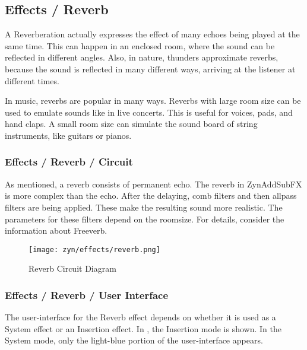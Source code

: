

\subsection{Effects / Reverb}
\label{subsec:effects_edit_reverb}

   A Reverberation actually expresses the effect of many echoes being played
   at the same time. This can happen in an enclosed room, where the sound can
   be reflected in different angles. Also, in nature, thunders approximate
   reverbs, because the sound is reflected in many different ways, arriving
   at the listener at different times.

   In music, reverbs are popular in many ways. Reverbs with large room size
   can be used to emulate sounds like in live concerts. This is useful for
   voices, pads, and hand claps. A small room size can simulate the sound
   board of string instruments, like guitars or pianos.

\subsubsection{Effects / Reverb / Circuit}
\label{subsubsec:effects_edit_reverb_circuit}

   As mentioned, a reverb consists of permanent echo. The reverb in
   ZynAddSubFX is more complex than the echo. After the delaying, comb
   filters and then allpass filters are being applied. These make the
   resulting sound more realistic. The parameters for these filters depend on
   the roomsize. For details, consider the information about Freeverb.

\begin{figure}[H]
   \centering
   \texttt{[image: zyn/effects/reverb.png]}
   \caption{Reverb Circuit Diagram}
   \label{fig:reverb_circuit_diagram}
\end{figure}

\subsubsection{Effects / Reverb / User Interface}
\label{subsubsec:effects_edit_reverb_ui}

   The user-interface for the Reverb effect depends on whether it is used as a
   System effect or an Insertion effect.
   In ,
   the Insertion mode is shown.  In the System mode, only the light-blue
   portion of the user-interface appears.

